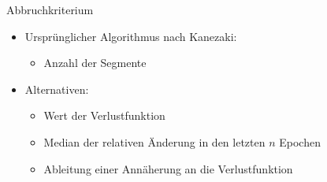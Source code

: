 \documentclass{beamer}
\begin{document}
\begin{frame}{Abbruchkriterium}
	\begin{itemize}
		\item Ursprünglicher Algorithmus nach Kanezaki:
		\begin{itemize}
			\item Anzahl der Segmente
		\end{itemize}
		\item Alternativen:
		\begin{itemize}
			\item Wert der Verlustfunktion
			\item Median der relativen Änderung in den letzten $n$ Epochen
			\item Ableitung einer Annäherung an die Verlustfunktion
		\end{itemize}
	\end{itemize}

\end{frame}
\end{document}
